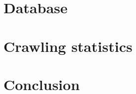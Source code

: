 \documentclass[runningheads]{llncs}
\begin{document}
\section{Database}

\section{Crawling statistics}

\section{Conclusion}

 
 
 
\end{document}
